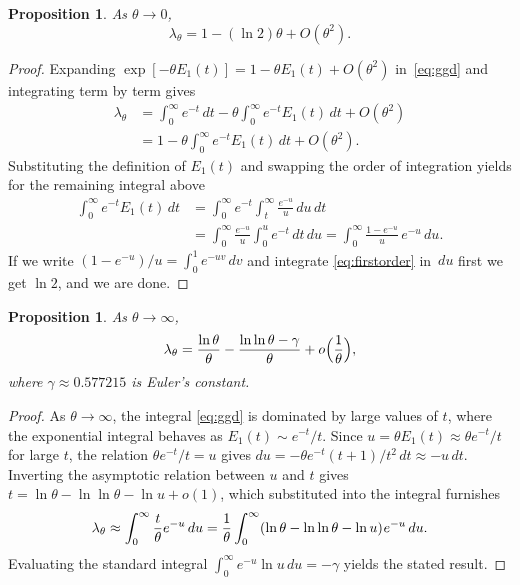 \documentclass{amsart}
\newtheorem{proposition}[theorem]{Proposition}
\theoremstyle{definition}
\theoremstyle{remark}
\numberwithin{equation}{section}
\newcommand{\mku}{\mkern1mu}
\begin{document}
\begin{proposition}
\label{prop:smalltheta}
As $\theta \to 0$,
\begin{equation}
\label{eq:smalltheta}
\lambda_{\theta} = 1 - (\ln{2})\theta + O(\theta^{2}).
\end{equation}
\end{proposition}
%
\begin{proof}
Expanding $\exp[-\theta E_{1}(t)] = 1-\theta E_{1}(t) + O(\theta^{2})$ in~\eqref{eq:ggd} and integrating term by term gives
\begin{equation}
\begin{split}
\lambda_{\theta} &= \int_{0}^{\infty} e^{-t}\,dt 
-\theta\int_{0}^{\infty} e^{-t} E_{1}(t)\,dt + O(\theta^{2}) \\
& = 1 - \theta \int_{0}^{\infty} e^{-t} E_{1}(t)\,dt + O(\theta^{2}).
\end{split}
\end{equation}
Substituting the definition of $E_{1}(t)$ and swapping the order of integration yields for the remaining integral above
\begin{equation}
\label{eq:firstorder}
\begin{split}
\int_{0}^{\infty} e^{-t} E_{1}(t)\,dt 
&= \int_{0}^{\infty} e^{-t} \int_{t}^{\infty} \frac{e^{-u}}{u}\,du\,dt \\
&= \int_{0}^{\infty} \frac{e^{-u}}{u} \int_{0}^{u} e^{-t}\,dt\,du 
= \int_{0}^{\infty} \frac{1 - e^{-u}}{u}\,e^{-u}\,du.
\end{split}
\end{equation}
If we write $(1-e^{-u})/u = \int_{0}^{1} e^{-uv}\,dv$ and integrate \eqref{eq:firstorder} in~$du$ first we get $\ln{2}$, and we are done.
\end{proof}

\begin{proposition}
\label{prop:largetheta}
As $\theta \to \infty$,
\begin{equation}
\label{eq:largetheta}
\lambda_{\theta} = \frac{\ln{\theta}}{\theta} - \frac{\ln{\ln{\theta}} - \gamma}{\theta} + o\Bigl(\frac{1}{\theta}\Bigr),
\end{equation}
where $\gamma \approx 0.577215$ is Euler's constant.
\end{proposition}
%
\begin{proof}
As $\theta \to \infty$, the integral \eqref{eq:ggd} is dominated by large values of $t$, where the exponential integral behaves as $E_{1}(t) \sim e^{-t}/t$. Since $u = \theta E_{1}(t) \approx \theta e^{-t}/t$ for large $t$, the relation $\theta e^{-t}/t = u$ gives $du = -\theta e^{-t} (t+1)/t^{2}\,dt \approx -u\,dt$. Inverting the asymptotic relation between $u$ and $t$ gives $t = \ln{\theta} - \ln{\ln{\theta}} - \ln{u} + o(1)$, which substituted into the integral furnishes
\begin{equation}
    \lambda_\theta \approx \int_0^\infty \frac{t}{\theta} e^{-u} \, du = \frac{1}{\theta} \int_{0}^{\infty} (\ln{\theta} - \ln{\ln{\theta}} - \ln{u})\mku e^{-u}\,du.
\end{equation}
Evaluating the standard integral $\int_{0}^{\infty}e^{-u}\ln{u}\,du = -\gamma$ yields the stated result.
\end{proof}
\end{document}
